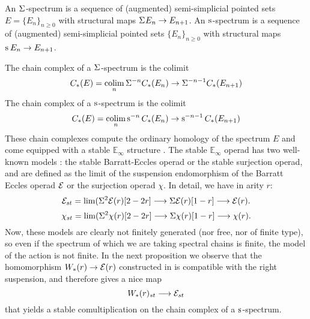 An $\Sigma^{}$-spectrum is a sequence of (augmented) semi-simplicial pointed sets $E = \{E_n\}_{n\geq 0}$ with structural maps $\Sigma^{} E_n\to E_{n+1}$. An $\operatorname{s}^{}$-spectrum is a sequence of (augmented) semi-simplicial pointed sets $\{E_n\}_{n\geq 0}$ with structural maps $\operatorname{s}^{} E_n\to E_{n+1}$. 

The chain complex of a $\Sigma^{}$-spectrum is the colimit 
\[
    C_*(E) = \operatorname*{colim}_n \Sigma^{-n} C_*(E_n)\to \Sigma^{-n-1} C_*(E_{n+1})
\]
The chain complex of a $\operatorname{s}^{}$-spectrum is the colimit 
\[
    C_*(E) = \operatorname*{colim}_n \operatorname{s}^{-n} C_*(E_n)\to \operatorname{s}^{-n-1} C_*(E_{n+1})
\]
These chain complexes compute the ordinary homology of the spectrum $E$ and come equipped with a stable $\mathbb{E}_\infty$ structure \cite{Gill2020}. The stable $\mathbb{E}_\infty$ operad has two well-known models \cite[Appendix]{berger2004combinatorial}: the stable Barratt-Eccles operad or the stable surjection operad, and are defined as the limit of the suspension endomorphism of the Barratt Eccles operad $\mathcal{E}$ or the surjection operad $\chi$. In detail, we have in arity $r$:
\[\mathcal{E}_{st} = \lim(  \Sigma^2\mathcal{E}(r)[2-2r] \longrightarrow \Sigma \mathcal{E}(r)[1-r]\longrightarrow \mathcal{E}(r).\]
\[\chi_{st} = \lim(  \Sigma^2\chi(r)[2-2r] \longrightarrow \Sigma \chi(r)[1-r]\longrightarrow \chi(r).\]
Now, these models are clearly not finitely generated (nor free, nor of finite type), so even if the spectrum of which we are taking spectral chains is finite, the model of the action is not finite. In the next proposition we observe that the homomorphism $W_*(r)\to \mathcal{E}(r)$ constructed in \cite{medina2021may_st} is compatible with the right suspension, and therefore gives a nice map
\[
    W_*(r)_{st}\longrightarrow \mathcal{E}_{st}
\]
that yields a stable comultiplication on the chain complex of a $\operatorname{s}^{}$-spectrum.



